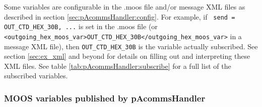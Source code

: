 \documentclass[11pt, letterpaper, oneside]{memoir}
\begin{document}
Some variables are configurable in the .moos file and/or message XML files as described in
section \ref{sec:pAcommsHandler:config}. For example, if
\verb| send = OUT_CTD_HEX_30B, ...| is set in the .moos file (or \\ \verb|<outgoing_hex_moos_var>OUT_CTD_HEX_30B</outgoing_hex_moos_var>| in a message XML file), then
\verb|OUT_CTD_HEX_30B| is the variable actually subscribed. See section \ref{sec:ex_xml} and beyond for details on filling out and interpreting these XML files. See table \ref{tab:pAcommsHandler:subscribe} for a full list of the subscribed variables.

\subsubsection{MOOS variables published by pAcommsHandler}
\end{document}
